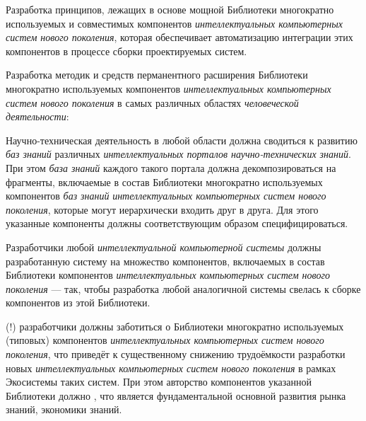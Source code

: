 \begin{textitemize}
	\medskip
	\item Разработка принципов, лежащих в основе мощной Библиотеки многократно используемых и совместимых компонентов \textit{интеллектуальных компьютерных систем нового поколения}, которая обеспечивает  автоматизацию интеграции этих компонентов в процессе сборки проектируемых систем.
	\item Разработка методик и средств перманентного расширения Библиотеки многократно используемых компонентов \textit{интеллектуальных компьютерных систем нового поколения} в самых различных областях \textit{человеческой деятельности}:
	\begin{textitemize}
		\item Научно-техническая деятельность в любой области должна сводиться к развитию \textit{баз знаний} различных \textit{интеллектуальных порталов научно-технических знаний}. При этом \textit{база знаний} каждого такого портала должна декомпозироваться на фрагменты, включаемые в состав Библиотеки многократно используемых компонентов \textit{баз знаний} \textit{интеллектуальных компьютерных систем нового поколения}, которые могут иерархически входить друг в друга. Для этого указанные компоненты должны соответствующим образом специфицироваться.
		\item Разработчики любой \textit{интеллектуальной компьютерной системы} должны  разработанную систему на множество компонентов, включаемых в состав Библиотеки компонентов\textit{ интеллектуальных компьютерных систем нового поколения} --- так, чтобы разработка любой аналогичной системы свелась к сборке компонентов из этой Библиотеки.
		\item {}(!) разработчики должны заботиться о  Библиотеки многократно используемых (типовых) компонентов \textit{интеллектуальных компьютерных систем нового поколения}, что приведёт к существенному снижению трудоёмкости разработки новых \textit{интеллектуальных компьютерных систем нового поколения} в рамках Экосистемы таких систем. При этом авторство компонентов  указанной Библиотеки должно , что является фундаментальной основной развития рынка знаний, экономики знаний. 
		

\end{textitemize}
\end{textitemize}
